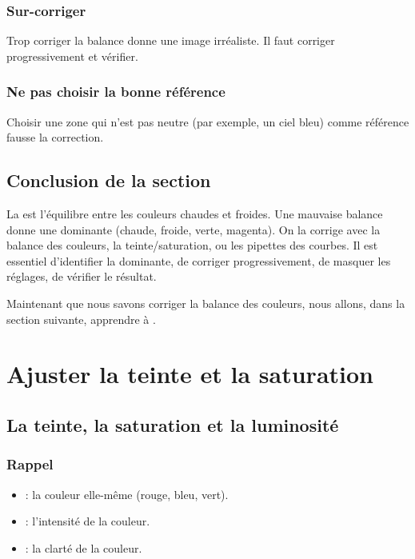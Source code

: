 \subsubsection{Sur-corriger}

Trop corriger la balance donne une image irréaliste. Il faut corriger progressivement et vérifier.

\subsubsection{Ne pas choisir la bonne référence}

Choisir une zone qui n'est pas neutre (par exemple, un ciel bleu) comme référence fausse la correction.

\subsection*{Conclusion de la section}

La  est l'équilibre entre les couleurs chaudes et froides. Une mauvaise balance donne une dominante (chaude, froide, verte, magenta). On la corrige avec la balance des couleurs, la teinte/saturation, ou les pipettes des courbes. Il est essentiel d'identifier la dominante, de corriger progressivement, de masquer les réglages, de vérifier le résultat.

Maintenant que nous savons corriger la balance des couleurs, nous allons, dans la section suivante, apprendre à .

\section{Ajuster la teinte et la saturation}

\subsection{La teinte, la saturation et la luminosité}

\subsubsection{Rappel}

\begin{itemize}
    \item {} : la couleur elle-même (rouge, bleu, vert).
    \item {} : l'intensité de la couleur.
    \item {} : la clarté de la couleur.
\end{itemize}

